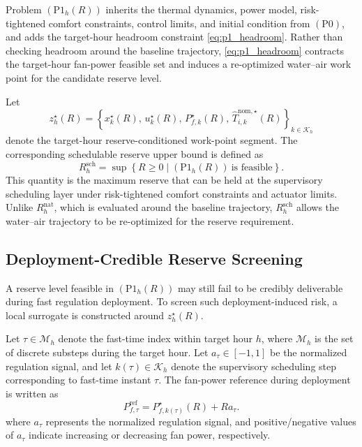 \documentclass[journal]{IEEEtran}
\theoremstyle{remark}
\begin{document}
	Problem \((\mathrm{P1}_h(R))\) inherits the thermal dynamics, power
	model, risk-tightened comfort constraints, control limits, and initial
	condition from \((\mathrm{P0})\), and adds the target-hour headroom
	constraint \eqref{eq:p1_headroom}. Rather than checking headroom around
	the baseline trajectory, \eqref{eq:p1_headroom} contracts the target-hour
	fan-power feasible set and induces a re-optimized water--air work point
	for the candidate reserve level.
	
	Let
	\begin{equation}
		z_h^\star(R)
		=
		\left\{
		x_k^\star(R),\,
		u_k^\star(R),\,
		P_{f,k}^\star(R),\,
		\hat T_{i,k}^{\mathrm{nom},\star}(R)
		\right\}_{k\in\mathcal{K}_h}
		\label{eq:work_point}
	\end{equation}
	denote the target-hour reserve-conditioned work-point segment. The
	corresponding schedulable reserve upper bound is defined as
	\begin{equation}
		R_h^{\mathrm{sch}}
		=
		\sup
		\left\{
		R\ge0
		\mid
		(\mathrm{P1}_h(R))\ \text{is feasible}
		\right\}.
		\label{eq:schedulable_reserve}
	\end{equation}
	This quantity is the maximum reserve that can be held at the
	supervisory scheduling layer under risk-tightened comfort constraints
	and actuator limits. Unlike \(R_h^{\mathrm{nat}}\), which is evaluated
	around the baseline trajectory, \(R_h^{\mathrm{sch}}\) allows the
	water--air trajectory to be re-optimized for the reserve requirement.
	\newpage
	\subsection{Deployment-Credible Reserve Screening}
	\label{subsec:credible_screening}
	
	A reserve level feasible in \((\mathrm{P1}_h(R))\) may still fail
	to be credibly deliverable during fast regulation deployment.
	To screen such deployment-induced risk, a local surrogate is
	constructed around \(z_h^\star(R)\).
	
	Let \(\tau\in\mathcal{M}_h\) denote the fast-time index within target hour \(h\), where \(\mathcal{M}_h\) is the set of discrete substeps during the target hour. Let \(a_\tau \in [-1, 1]\) be the normalized regulation signal, and let \(k(\tau) \in \mathcal{K}_h\) denote the supervisory scheduling step corresponding to fast-time instant \(\tau\). The fan-power reference during deployment is written as
	\begin{equation}
		P_{f,\tau}^{\mathrm{ref}}
		=
		P_{f,k(\tau)}^\star(R)+R a_\tau .
		\label{eq:fan_ref}
	\end{equation}
	where \(a_\tau\) represents the normalized regulation signal, and positive/negative values of \(a_\tau\) indicate increasing or decreasing fan power, respectively.
	
\end{document}
